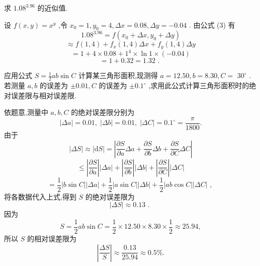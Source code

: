 \begin{example}

\end{example}
求 \({1.08}^{3.96}\) 的近似值.

\begin{solution}

\end{solution}
设 \(f\left( {x,y}\right)  = {x}^{y}\) ,令 \({x}_{0} = 1,{y}_{0} = 4,{\Delta x} = {0.08},{\Delta y} =  - {0.04}\) . 由公式 (3) 有
\[
{1.08}^{3.96} = f\left( {{x}_{0} + {\Delta x},{y}_{0} + {\Delta y}}\right)
\]
\[
\approx  f\left( {1,4}\right)  + {f}_{x}\left( {1,4}\right) {\Delta x} + {f}_{y}\left( {1,4}\right) {\Delta y}
\]
\[
= 1 + 4 \times  {0.08} + {1}^{4} \times  \ln 1 \times  \left( {-{0.04}}\right)
\]
\[
= 1 + {0.32} = {1.32}\text{ . }
\]
\begin{example}

\end{example}
应用公式 \(S = \frac{1}{2}{ab}\sin C\) 计算某三角形面积,现测得 \(a = {12.50},b = {8.30},C =\)  \({30}^{ \circ  }\) . 若测量 \(a,b\) 的误差为 \(\pm  {0.01},C\) 的误差为 \(\pm  {0.1}^{ \circ  }\) ,求用此公式计算三角形面积时的绝对误差限与相对误差限.

\begin{solution}

\end{solution}
依题意,测量中 \(a,b,C\) 的绝对误差限分别为
\[
\left| {\Delta a}\right|  = {0.01},\;\left| {\Delta b}\right|  = {0.01},\;\left| {\Delta C}\right|  = {0.1}^{ \circ  } = \frac{\pi }{1800}.
\]
由于
\[
\left| {\Delta S}\right|  \approx  \left| {\mathrm{d}S}\right|  = \left| {\frac{\partial S}{\partial a}{\Delta a} + \frac{\partial S}{\partial b}{\Delta b} + \frac{\partial S}{\partial C}{\Delta C}}\right|
\]
\[
\leq  \left| \frac{\partial S}{\partial a}\right| \left| {\Delta a}\right|  + \left| \frac{\partial S}{\partial b}\right| \left| {\Delta b}\right|  + \left| \frac{\partial S}{\partial C}\right| \left| {\Delta C}\right|
\]
\[
= \frac{1}{2}\left| {b\sin C}\right| \left| {\Delta a}\right|  + \frac{1}{2}\left| {a\sin C}\right| \left| {\Delta b}\right|  + \frac{1}{2}\left| {{ab}\cos C}\right| \left| {\Delta C}\right| \text{ , }
\]
将各数据代入上式,得到 \(S\) 的绝对误差限为
\[
\left| {\Delta S}\right|  \approx  {0.13}\text{ . }
\]
因为
\[
S = \frac{1}{2}{ab}\sin C = \frac{1}{2} \times  {12.50} \times  {8.30} \times  \frac{1}{2} \approx  {25.94},
\]
所以 \(S\) 的相对误差限为
\[
\left| \frac{\Delta S}{S}\right|  \approx  \frac{0.13}{25.94} \approx  {0.5}\% .
\]
